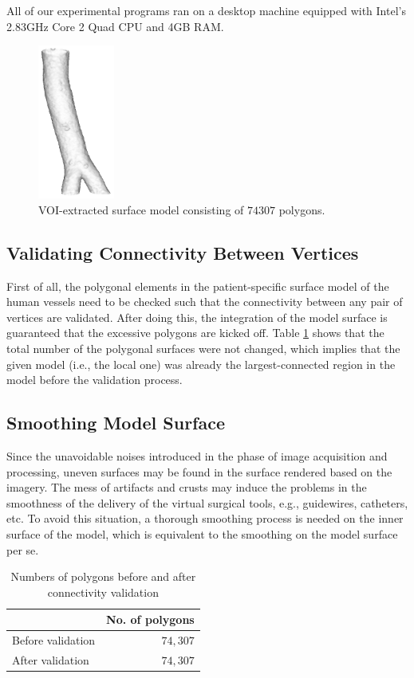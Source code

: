 All of our experimental programs ran on a desktop machine equipped with Intel's 2.83GHz Core 2 Quad CPU and 4GB RAM.

\begin{figure}[t]
\centering
\includegraphics[height=2.0in]{Figures/chap06/original.png}
\caption{VOI-extracted surface model consisting of $74307$ polygons.}
\label{fig:VOI}
\end{figure}

\subsection{Validating Connectivity Between Vertices}

First of all, the polygonal elements in the patient-specific surface model of the human vessels need to be checked such that the connectivity between any pair of vertices are validated. %
After doing this, the integration of the model surface is guaranteed that the excessive polygons are kicked off.
Table \ref{tbl:Connectivity} shows that the total number of the polygonal surfaces were not changed, which implies that the given model (i.e., the local one) was already the largest-connected region in the model before the validation process. %

\subsection{Smoothing Model Surface}

Since the unavoidable noises introduced in the phase of image acquisition and processing, uneven surfaces may be found in the surface rendered based on the imagery.
The mess of artifacts and crusts may induce the problems in the smoothness of the delivery of the virtual surgical tools, e.g., guidewires, catheters, etc.
To avoid this situation, a thorough smoothing process is needed on the inner surface of the model, which is equivalent to the smoothing on the model surface per se.
\begin{table}[t]
\renewcommand{\arraystretch}{1.3}
\caption{Numbers of polygons before and after connectivity validation}
\label{tbl:Connectivity}
\centering
\begin{tabular}
{@{}l||r@{}}
\hline
~                       & No. of polygons \\
\hline\hline
Before validation       & $74,307$  \\
After validation        & $74,307$  \\
\hline
\end{tabular}
\end{table}

